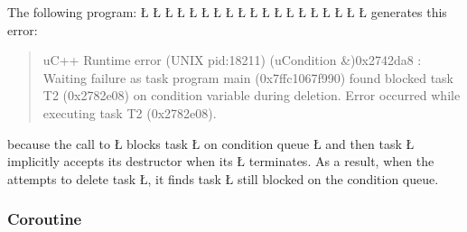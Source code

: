 \documentclass[openright,twoside]{report}
\begin{document}
The following program:
\LGinlinefalse\LGbegin\lgrinde
\L{}
\L{\LB{}}
\L{}
\L{\LB{}}
\L{}
\L{\LB{}}
\L{\LB{\};}}
\endlgrinde\LGend
\LGinlinefalse\LGbegin\lgrinde
\L{}
\L{\LB{}}
\L{\LB{}}
\L{}
\L{\LB{}}
\L{\LB{\};}}
\endlgrinde\LGend
\LGinlinefalse\LGbegin\lgrinde
\L{}
\L{\LB{}}
\L{\LB{}}
\L{\LB{}}
\L{\LB{}}
\L{\LB{\}}}
\endlgrinde\LGend
generates this error:
\begin{quote}
\BGfont
uC++ Runtime error (UNIX pid:18211) (uCondition \&)0x2742da8 : Waiting failure as task program main (0x7ffc1067f990) found blocked task T2 (0x2782e08) on condition variable during deletion.
Error occurred while executing task T2 (0x2782e08).
\end{quote}
because the call to \LGinlinetrue\LGbegin\lgrinde\L{}\endlgrinde\LGend{} blocks task \LGinlinetrue\LGbegin\lgrinde\L{}\endlgrinde\LGend{} on condition queue \LGinlinetrue\LGbegin\lgrinde\L{}\endlgrinde\LGend{} and then task \LGinlinetrue\LGbegin\lgrinde\L{}\endlgrinde\LGend{} implicitly accepts its destructor when its \LGinlinetrue\LGbegin\lgrinde\L{}\endlgrinde\LGend{} terminates.
As a result, when the  attempts to delete task \LGinlinetrue\LGbegin\lgrinde\L{}\endlgrinde\LGend{}, it finds task \LGinlinetrue\LGbegin\lgrinde\L{}\endlgrinde\LGend{} still blocked on the condition queue.


\subsubsection{Coroutine}
\end{document}
